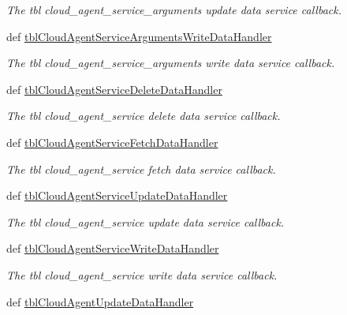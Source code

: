 \begin{DoxyCompactItemize}
\begin{DoxyCompactList}\small\item\em The tbl cloud\-\_\-agent\-\_\-service\-\_\-arguments update data service callback. \end{DoxyCompactList}\item 
def \hyperlink{classmysql__wrapper__old_1_1MySQLdbWrapper_a912b4dc80839b913247db60a2bcbdaf0}{tbl\-Cloud\-Agent\-Service\-Arguments\-Write\-Data\-Handler}
\begin{DoxyCompactList}\small\item\em The tbl cloud\-\_\-agent\-\_\-service\-\_\-arguments write data service callback. \end{DoxyCompactList}\item 
def \hyperlink{classmysql__wrapper__old_1_1MySQLdbWrapper_a692bccb2d17835c9fabe898eeb1b1ce2}{tbl\-Cloud\-Agent\-Service\-Delete\-Data\-Handler}
\begin{DoxyCompactList}\small\item\em The tbl cloud\-\_\-agent\-\_\-service delete data service callback. \end{DoxyCompactList}\item 
def \hyperlink{classmysql__wrapper__old_1_1MySQLdbWrapper_a45b9d0793a271d80c6c9c0c92cdec6f2}{tbl\-Cloud\-Agent\-Service\-Fetch\-Data\-Handler}
\begin{DoxyCompactList}\small\item\em The tbl cloud\-\_\-agent\-\_\-service fetch data service callback. \end{DoxyCompactList}\item 
def \hyperlink{classmysql__wrapper__old_1_1MySQLdbWrapper_a6ee6b075b37c4ac687a6ed041cbd1243}{tbl\-Cloud\-Agent\-Service\-Update\-Data\-Handler}
\begin{DoxyCompactList}\small\item\em The tbl cloud\-\_\-agent\-\_\-service update data service callback. \end{DoxyCompactList}\item 
def \hyperlink{classmysql__wrapper__old_1_1MySQLdbWrapper_aeb37a39f0107ef10013b571a6a3e853f}{tbl\-Cloud\-Agent\-Service\-Write\-Data\-Handler}
\begin{DoxyCompactList}\small\item\em The tbl cloud\-\_\-agent\-\_\-service write data service callback. \end{DoxyCompactList}\item 
def \hyperlink{classmysql__wrapper__old_1_1MySQLdbWrapper_af532b6df754e517f1482731445233564}{tbl\-Cloud\-Agent\-Update\-Data\-Handler}

\end{DoxyCompactItemize}
